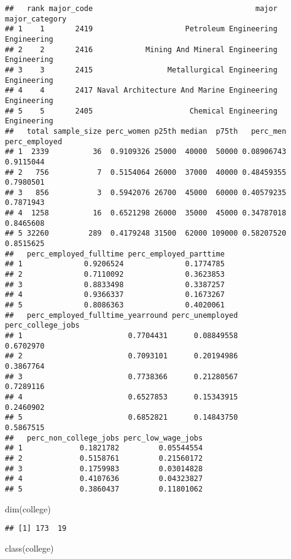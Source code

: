 \documentclass[
]{article}
\newenvironment{Shaded}{\begin{snugshade}}{\end{snugshade}}
\newcommand{\FunctionTok}[1]{\textcolor[rgb]{0.00,0.00,0.00}{#1}}
\newcommand{\NormalTok}[1]{#1}
\begin{document}
\begin{verbatim}
##   rank major_code                                     major major_category
## 1    1       2419                     Petroleum Engineering    Engineering
## 2    2       2416            Mining And Mineral Engineering    Engineering
## 3    3       2415                 Metallurgical Engineering    Engineering
## 4    4       2417 Naval Architecture And Marine Engineering    Engineering
## 5    5       2405                      Chemical Engineering    Engineering
##   total sample_size perc_women p25th median  p75th   perc_men perc_employed
## 1  2339          36  0.9109326 25000  40000  50000 0.08906743     0.9115044
## 2   756           7  0.5154064 26000  37000  40000 0.48459355     0.7980501
## 3   856           3  0.5942076 26700  45000  60000 0.40579235     0.7871943
## 4  1258          16  0.6521298 26000  35000  45000 0.34787018     0.8465608
## 5 32260         289  0.4179248 31500  62000 109000 0.58207520     0.8515625
##   perc_employed_fulltime perc_employed_parttime
## 1              0.9206524              0.1774785
## 2              0.7110092              0.3623853
## 3              0.8833498              0.3387257
## 4              0.9366337              0.1673267
## 5              0.8086363              0.4020061
##   perc_employed_fulltime_yearround perc_unemployed perc_college_jobs
## 1                        0.7704431      0.08849558         0.6702970
## 2                        0.7093101      0.20194986         0.3867764
## 3                        0.7738366      0.21280567         0.7289116
## 4                        0.6527853      0.15343915         0.2460902
## 5                        0.6852821      0.14843750         0.5867515
##   perc_non_college_jobs perc_low_wage_jobs
## 1             0.1821782         0.05544554
## 2             0.5158761         0.21560172
## 3             0.1759983         0.03014828
## 4             0.4107636         0.04323827
## 5             0.3860437         0.11801062
\end{verbatim}

\begin{Shaded}
\begin{Highlighting}[]
\FunctionTok{dim}\NormalTok{(college)}
\end{Highlighting}
\end{Shaded}

\begin{verbatim}
## [1] 173  19
\end{verbatim}

\begin{Shaded}
\begin{Highlighting}[]
\FunctionTok{class}\NormalTok{(college)}
\end{Highlighting}
\end{Shaded}
\end{document}
